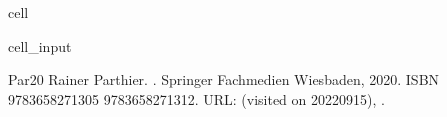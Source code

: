 \documentclass[letterpaper,10pt,english]{jupyterBook}
\begin{document}
\begin{sphinxuseclass}{cell}
\begin{sphinxVerbatimInput}
\begin{sphinxuseclass}{cell_input}
\begin{sphinxVerbatim}[commandchars=\\\{\}]
\end{sphinxVerbatim}

\end{sphinxuseclass}\end{sphinxVerbatimInput}

\end{sphinxuseclass}
\begin{sphinxthebibliography}{Par20}
\sphinxAtStartPar
Rainer Parthier. . Springer Fachmedien Wiesbaden, 2020. ISBN 978\sphinxhyphen{}3\sphinxhyphen{}658\sphinxhyphen{}27130\sphinxhyphen{}5 978\sphinxhyphen{}3\sphinxhyphen{}658\sphinxhyphen{}27131\sphinxhyphen{}2. URL:  (visited on 2022\sphinxhyphen{}09\sphinxhyphen{}15), .
\end{sphinxthebibliography}







\renewcommand{\indexname}{Index}
\printindex
\end{document}
